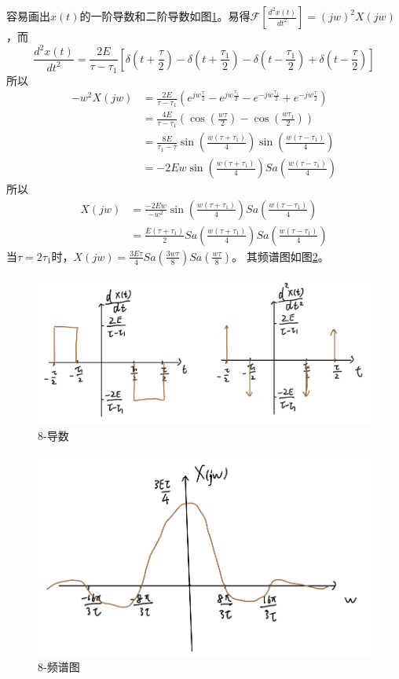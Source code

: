 \documentclass[answers]{exam}  %
\begin{document}
\begin{questions}
\begin{solution}
	容易画出$x(t)$的一阶导数和二阶导数如图\ref{fig:13}。易得$\mathcal{F}[\frac{d^2x(t)}{dt^2}]=(jw)^2X(jw)$，而$$\frac{d^2x(t)}{dt^2}=\frac{2E}{\tau-\tau_1}[\delta(t+\frac{\tau}{2})-\delta(t+\frac{\tau_1}{2})-\delta(t-\frac{\tau_1}{2})+\delta(t-\frac{\tau}{2})]$$所以
	\begin{align*} 
	    -w^2X(jw)&=\frac{2E}{\tau-\tau_1}(e^{jw\frac{\tau}{2}}-e^{jw\frac{\tau_1}{2}}-e^{-jw\frac{\tau_1}{2}}+e^{-jw\frac{\tau}{2}})\\
	    &=\frac{4E}{\tau-\tau_1}(\cos(\frac{w\tau}{2})-\cos(\frac{w\tau_1}{2}))\\
	    &=\frac{8E}{\tau_1-\tau}\sin(\frac{w(\tau+\tau_1)}{4})\sin(\frac{w(\tau-\tau_1)}{4})\\
	    &=-2Ew\sin(\frac{w(\tau+\tau_1)}{4})Sa(\frac{w(\tau-\tau_1)}{4})
	\end{align*}
    所以\begin{align*}
    	X(jw)&=\frac{-2Ew}{-w^2}\sin(\frac{w(\tau+\tau_1)}{4})Sa(\frac{w(\tau-\tau_1)}{4})\\
    	  &=\frac{E(\tau+\tau_1)}{2}Sa(\frac{w(\tau+\tau_1)}{4})Sa(\frac{w(\tau-\tau_1)}{4})
    \end{align*}
    当$\tau=2\tau_1$时，$X(jw)=\frac{3E\tau}{4}Sa(\frac{3w\tau}{8})Sa(\frac{w\tau}{8})$。
    其频谱图如图\ref{fig:14}。
\end{solution}
\begin{figure}
	\centering
	\includegraphics[width=0.6\linewidth]{pics/8-0.png}
	\caption{8-导数}
	\label{fig:13}
\end{figure}
\begin{figure}
	\centering
	\includegraphics[width=0.6\linewidth]{pics/8-1.png}
	\caption{8-频谱图}
	\label{fig:14}
\end{figure}


\end{questions}
\end{document}
